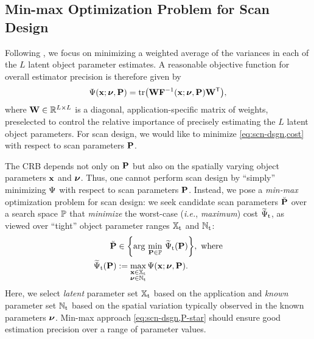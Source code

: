 \subsection{Min-max Optimization Problem for Scan Design}
\label{ss,scn-dsgn,crb,minmax}

Following \cite{chernoff:53:lod}, 
we focus on minimizing a weighted average 
of the variances 
in each of the $L$ latent object parameter estimates. 
A reasonable objective function 
for overall estimator precision 
is therefore given by
\begin{align}
	\costa{\bmx; \bmnu, \bmP} =
		\trace{\bmW \bmF^{-1}\paren{\bmx; \bmnu, \bmP} \bmW\tpose}, 
		\label{eq:scn-dsgn,cost}
\end{align}
where $\mathbf{W} \in \mathbb{R}^{L \times L}$ 
is a diagonal, application-specific  matrix of weights, 
preselected to control the relative importance 
of precisely estimating the $L$ latent object parameters. 
For scan design, 
we would like to minimize \eqref{eq:scn-dsgn,cost} 
with respect to scan parameters $\mathbf{P}$.
 
The CRB depends not only on $\mathbf{P}$ 
but also on the spatially varying object parameters 
$\mathbf{x}$ and $\boldsymbol{\nu}$. 
Thus, one cannot perform scan design 
by ``simply'' minimizing $\Psi$ 
with respect to scan parameters $\mathbf{P}$. 
Instead, we pose a 
\emph{min-max} optimization problem 
for scan design: 
we seek candidate scan parameters $\breve{\mathbf{P}}$ 
over a search space $\mathbb{P}$ 
that \emph{minimize} the worst-case 
(\emph{i.e.}, \emph{maximum}) 
cost $\widetilde{\Psi}_{\mathrm{t}}$, 
as viewed over ``tight'' object parameter ranges 
$\mathbb{X}_\mathrm{t}$ and $\mathbb{N}_\mathrm{t}$:
\begin{align}
	\breve{\bmP} &\in 
		\set{\argmin{\bmP \in \setP} \costawt{\bmP}}, \where 
		\label{eq:scn-dsgn,P-cand} \\
	\costawt{\bmP} &:=
		\max_{\substack{\bmx \in \setXt \\ \bmnu \in \setNt}}
		\costa{\bmx; \bmnu, \bmP}.
		\label{eq:scn-dsgn,cost-tight}
\end{align}
Here, 
we select \emph{latent} parameter set $\mathbb{X}_\mathrm{t}$ 
based on the application 
and \emph{known} parameter set $\mathbb{N}_\mathrm{t}$ 
based on the spatial variation typically observed 
in the known parameters $\boldsymbol{\nu}$. 
Min-max approach \eqref{eq:scn-dsgn,P-star} 
should ensure good estimation precision 
over a range of parameter values.

